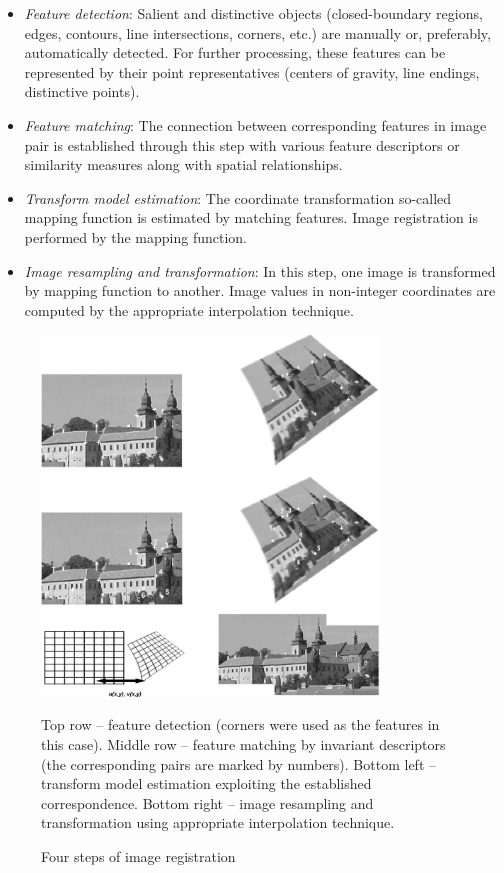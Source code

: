 \begin{itemize}
	\item \textit{Feature detection}: Salient and distinctive objects (closed-boundary regions, edges, contours, line intersections,
corners, etc.) are manually or, preferably, automatically detected. For further processing, these features can be represented by their point representatives (centers of gravity, line endings, distinctive points).
	\item \textit{Feature matching}: The connection between corresponding features in image pair is established through this step with various feature descriptors or similarity measures along with spatial relationships.
	\item \textit{Transform model estimation}: The coordinate transformation so-called mapping function is estimated by matching features.  Image registration is performed by the mapping function.
	\item \textit{Image resampling and transformation}: In this step, one image is transformed by mapping function to another. Image values in non-integer coordinates are computed by the appropriate interpolation technique.
\end{itemize} 

\begin{figure}[htbp]
	\begin{center}
	\includegraphics[width=0.80\textwidth]{images/image registration}
	\caption{Four steps of image registration}
	\label{fig:image registraion}
	\end{center}
	{\small  Top row -- feature detection (corners were used as the features in this case). Middle row -- feature matching by invariant descriptors (the corresponding pairs are marked by numbers). Bottom left -- transform model estimation exploiting the established correspondence. Bottom right -- image resampling and transformation using appropriate interpolation technique. \cite{zitovaImageRegistrationMethods2003}}
\end{figure}

